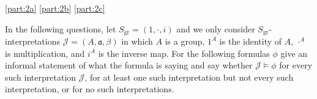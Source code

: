 \documentclass[boxes,pages,color=CornflowerBlue]{homework}
\begin{document}
\begin{solution}
    \ref{part:2a}
    \ref{part:2b}
    \ref{part:2c}
\end{solution}

\begin{problem}
In the following questions, let $S_\text{gr} = (1, \cdot, i)$ and we only consider $S_\text{gr}$-interpretations $\mathcal{J} = (A, \mathfrak{a}, \beta)$ in which $A$ is a group, $1^A$ is the identity of $A$, $\cdot^A$ is multiplication, and $i^A$ is the inverse map.
For the following formulas $\phi$ give an informal statement of what the formula is saying and say whether $\mathcal{J} \vDash \phi$ for every such interpretation $\mathcal{J}$, for at least one such interpretation but not every such interpretation, or for no such interpretations.
\end{problem}
\end{document}
